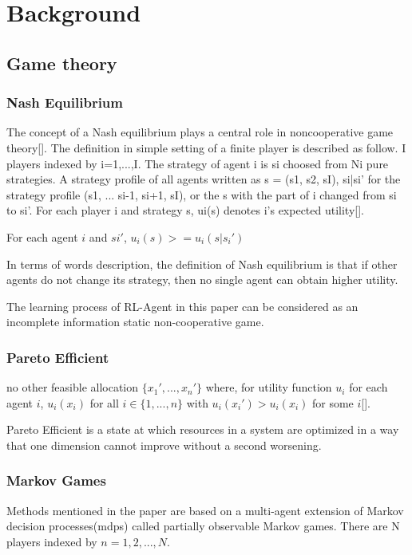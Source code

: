 \chapter{Background}

\section{Game theory}

\subsection{Nash Equilibrium}
The concept of a Nash equilibrium plays a central role in noncooperative game theory[]. The definition in simple setting of a finite player is described as follow. I players indexed by i=1,...,I. The strategy of agent i is si choosed from Ni pure strategies. A strategy profile of all agents written as s = (s1, s2, sI), si|si' for the strategy profile (s1, ... si-1, si+1, sI), or the s with the part of i changed from si to si'. For each player i and strategy s, ui(s) denotes i's expected utility[]. 

\begin{proposition}
For each agent $i$ and $si'$, $u_i(s) >= u_i(s|s_i')$
\end{proposition}

In terms of words description, the definition of Nash equilibrium is that if other agents do not change its strategy, then no single agent can obtain higher utility. 

The learning process of RL-Agent in this paper can be considered as an incomplete information static non-cooperative game.
 
\subsection{Pareto Efficient}

\begin{proposition}
no other feasible allocation $\{x_{1}',...,x_{n}'\}$ where, for 
utility function $u_i$ for each agent $i$, $u_{i}(x_{i})$ for all $i\in \{1,...,n\}$ with $u_{i}(x_{i}')>u_{i}(x_{i})$ for some $i$[].
\end{proposition}

Pareto Efficient is a state at which resources in a system are optimized in a way that one dimension cannot improve without a second worsening. 

\subsection{Markov Games}
Methods mentioned in the paper are based on a multi-agent extension of Markov decision processes(\gls{mdps}) called partially observable Markov games. There are N players indexed by $n=1,2,...,N$.

